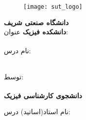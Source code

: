 \thispagestyle{empty}
\begin{center}
	\begin{figure}
		\begin{center}
			\texttt{[image: sut\_logo]}
		\end{center}
	\end{figure}
	\small
	\textbf{دانشگاه صنعتی شریف\\
		دانشکده فیزیک}
	\vfill
	\small
	عنوان:\\
	\Huge
	\textbf{\titlearticle} \\ 
		
	\vfill
	\small
	نام درس: \\ 
	\large\textbf{\course}  \\
	\vspace*{0.5cm}
	
	
	\vfill
	\small
	توسط:\\
	\large
	\textbf{\auth}\\
	\small
	\textbf{دانشجوی کارشناسی فیزیک}
	
	\vfill
	\small
	نام استاد(اساتید) درس:\\
	\normalsize
	\textbf{\profs}
	
	\vfill
	\small
	\term\\
	\newpage
	
\end{center}

